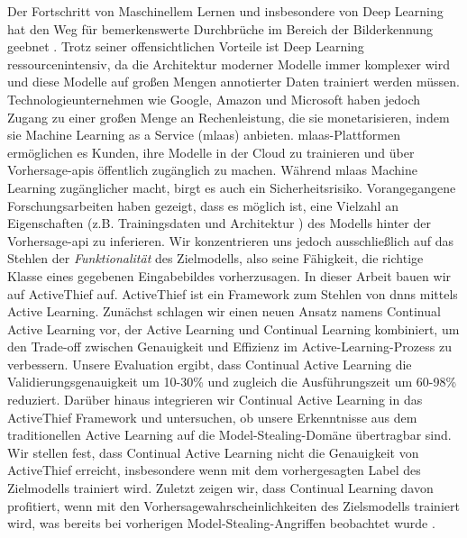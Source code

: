 
\Abstract
Der Fortschritt von Maschinellem Lernen und insbesondere von Deep Learning hat den Weg für bemerkenswerte Durchbrüche im Bereich der Bilderkennung geebnet
\parencite{goodfellow2020generative,he2016deep,lecun1989backpropagation}. Trotz seiner offensichtlichen Vorteile ist Deep Learning ressourcenintensiv, da
die Architektur moderner Modelle immer komplexer wird und diese Modelle auf großen Mengen annotierter Daten trainiert werden müssen. Technologieunternehmen wie Google,
Amazon und Microsoft haben jedoch Zugang zu einer großen Menge an Rechenleistung, die sie monetarisieren, indem sie Machine Learning as a Service (\gls{mlaas}) anbieten.
\gls{mlaas}-Plattformen ermöglichen es Kunden, ihre Modelle in der Cloud zu trainieren und über Vorhersage-\glspl{api} öffentlich zugänglich zu machen.
Während \gls{mlaas} Machine Learning zugänglicher macht, birgt es auch ein Sicherheitsrisiko. Vorangegangene Forschungsarbeiten haben gezeigt, dass es möglich ist,
eine Vielzahl an Eigenschaften (z.B. Trainingsdaten \cite{shokri2017membership} und Architektur \cite{oh2019towards}) des Modells hinter der Vorhersage-\gls{api}
\parencite{papernot2017practical,tramer2016stealing} zu inferieren. Wir konzentrieren uns jedoch ausschließlich auf das Stehlen der \textit{Funktionalität} des Zielmodells,
also seine Fähigkeit, die richtige Klasse eines gegebenen Eingabebildes vorherzusagen. In dieser Arbeit bauen wir auf ActiveThief \cite{pal2020activethief} auf. ActiveThief
ist ein Framework zum Stehlen von \glspl{dnn} mittels Active Learning. Zunächst schlagen wir einen neuen Ansatz namens Continual Active Learning vor, der Active Learning
und Continual Learning kombiniert, um den Trade-off zwischen Genauigkeit und Effizienz im Active-Learning-Prozess zu verbessern. Unsere Evaluation ergibt, dass Continual
Active Learning die Validierungsgenauigkeit um 10-30\% und zugleich die Ausführungszeit um 60-98\% reduziert. Darüber hinaus integrieren wir Continual Active Learning in
das ActiveThief Framework und untersuchen, ob unsere Erkenntnisse aus dem traditionellen Active Learning auf die Model-Stealing-Domäne übertragbar sind. Wir stellen fest,
dass Continual Active Learning nicht die Genauigkeit von ActiveThief erreicht, insbesondere wenn mit dem vorhergesagten Label des Zielmodells trainiert wird. Zuletzt zeigen wir,
dass Continual Learning davon profitiert, wenn mit den Vorhersagewahrscheinlichkeiten des Zielsmodells trainiert wird, was bereits bei vorherigen Model-Stealing-Angriffen
beobachtet wurde \parencite{orekondy2019knockoff,pal2020activethief}.

